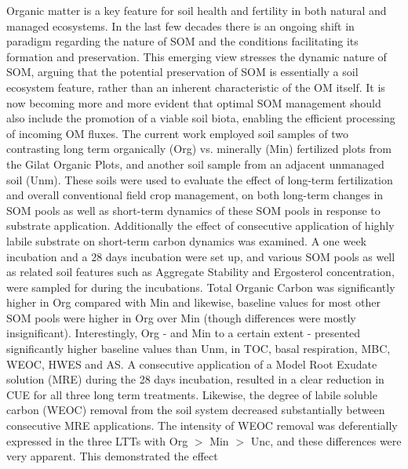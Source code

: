 	Organic matter is a key feature for soil health and fertility in both natural and managed ecosystems. In the last few decades there is an ongoing shift in paradigm regarding the nature of SOM and the conditions facilitating its formation and preservation. This emerging view stresses the dynamic nature of SOM, arguing that the potential preservation of SOM is essentially a soil ecosystem feature, rather than an inherent characteristic of the OM itself. It is now becoming more and more evident that optimal SOM management should also include the promotion of a viable soil biota, enabling the efficient processing of incoming OM fluxes. The current work employed soil samples of two contrasting long term organically (Org) vs. minerally (Min) fertilized plots from the Gilat Organic Plots, and another soil sample from an adjacent unmanaged soil (Unm). These soils were used to evaluate the effect of long-term fertilization and overall conventional field crop management, on both long-term changes in SOM pools as well as short-term dynamics of these SOM pools in response to substrate application. Additionally the effect of consecutive application of highly labile substrate on short-term carbon dynamics was examined. 
	A one week incubation and a 28 days incubation were set up, and various SOM pools as well as related soil features such as Aggregate Stability and Ergosterol concentration, were sampled for during the incubations. 
	Total Organic Carbon was significantly higher in Org compared with Min and likewise, baseline values  for most other SOM pools were higher in Org over Min (though differences were mostly insignificant). Interestingly, Org - and Min to a certain extent - presented significantly higher baseline values than Unm, in TOC, basal respiration, MBC, WEOC, HWES and AS. 
	A consecutive application of a Model Root Exudate solution (MRE) during the 28 days incubation, resulted in a clear reduction in CUE for all three long term treatments. Likewise, the degree of labile soluble carbon (WEOC) removal from the soil system decreased substantially between consecutive MRE applications. The intensity of WEOC removal was deferentially expressed in the three LTTs with Org $  > $ Min $ > $ Unc, and these differences were very apparent. This demonstrated the effect       
	
	
     